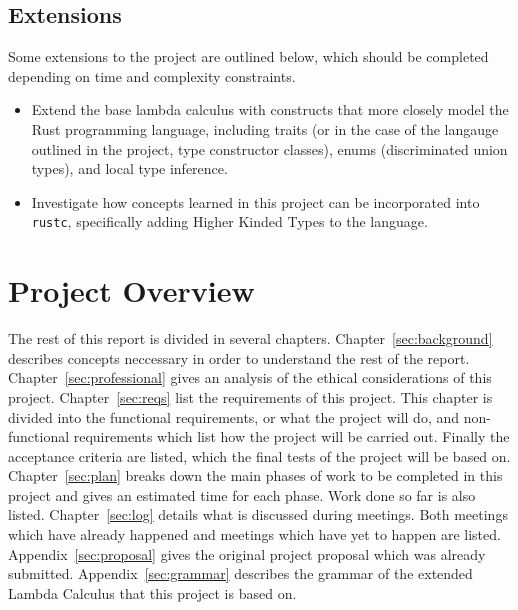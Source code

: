 \subsection{Extensions}
Some extensions to the project are outlined below, which should be completed
depending on time and complexity constraints.

\begin{itemize}
    \item
        Extend the base lambda calculus with constructs that more closely model
        the Rust programming language, including traits (or in the case of the
        langauge outlined in the project, type constructor classes), enums 
        (discriminated union types), and local type inference.
    \item
        Investigate how concepts learned in this project can be incorporated
        into \texttt{rustc}, specifically adding Higher Kinded Types to the
        language.
\end{itemize}

\section{Project Overview}
The rest of this report is divided in several chapters.
Chapter~\ref{sec:background} describes concepts neccessary in order to
understand the rest of the report.  Chapter~\ref{sec:professional} gives an
analysis of the ethical considerations of this project. Chapter~\ref{sec:reqs}
list the requirements of this project.  This chapter is divided into the
functional requirements, or what the project will do, and non-functional
requirements which list how the project will be carried out. Finally the
acceptance criteria are listed, which the final tests of the project will be
based on. Chapter~\ref{sec:plan} breaks down the main phases of work to be
completed in this project and gives an estimated time for each phase. Work done
so far is also listed. Chapter~\ref{sec:log} details what is discussed during
meetings. Both meetings which have already happened and meetings which have yet
to happen are listed. Appendix~\ref{sec:proposal} gives the original project
proposal which was already submitted. Appendix~\ref{sec:grammar} describes the
grammar of the extended Lambda Calculus that this project is based on.
